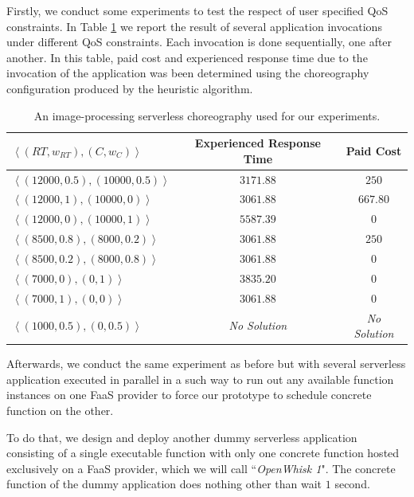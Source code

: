 \documentclass[12pt,a4paper]{report}
\newcommand{\ItalicQuotMark}[1]{``\textit{#1}"}
\begin{document}
Firstly, we conduct some experiments to test the respect of user specified QoS constraints. In Table \ref{tableTestQoS} we report the result of several application invocations under different QoS constraints. Each invocation is done sequentially, one after another. In this table, paid cost and experienced response time due to the invocation of the application was been determined using the choreography configuration produced by the heuristic algorithm.

\begin{table}
	\centering
	\begin{tabular}{l | c | c} 
		\toprule
		$\left\langle (RT,w_{RT}),(C,w_{C}) \right\rangle$ & Experienced Response Time & Paid Cost \\
		\midrule	
		$\left\langle (12000,0.5),(10000,0.5) \right\rangle$ & $3171.88$ & $250$ \\ 
		\hline
		$\left\langle (12000,1),(10000,0) \right\rangle$ & $3061.88$ & $667.80$ \\ 
		\hline
		$\left\langle (12000,0),(10000,1) \right\rangle$ & $5587.39$ & $0$ \\
		\hline
		$\left\langle (8500,0.8),(8000,0.2) \right\rangle$ & $3061.88$ & $250$ \\
		\hline
		$\left\langle (8500,0.2),(8000,0.8) \right\rangle$ & $3061.88$ & $0$ \\
		\hline
		$\left\langle (7000,0),(0,1) \right\rangle$ & $3835.20$ & $0$ \\
		\hline
		$\left\langle (7000,1),(0,0) \right\rangle$ & $3061.88$ & $0$ \\
		\hline
		$\left\langle (1000,0.5),(0,0.5) \right\rangle$ & \textit{No Solution} & \textit{No Solution} \\
		\bottomrule	
	\end{tabular}
	\caption{An image-processing serverless choreography used for our experiments.}
	\label{tableTestQoS}
\end{table}

Afterwards, we conduct the same experiment as before but with several serverless application executed in parallel in a such way to run out any available function instances on one FaaS provider to force our prototype to schedule concrete function on the other.

To do that, we design and deploy another dummy serverless application consisting of a single executable function with only one concrete function hosted exclusively on a FaaS provider, which we will call \ItalicQuotMark{OpenWhisk 1}. The concrete function of the dummy application does nothing other than wait $1$ second.
\end{document}
